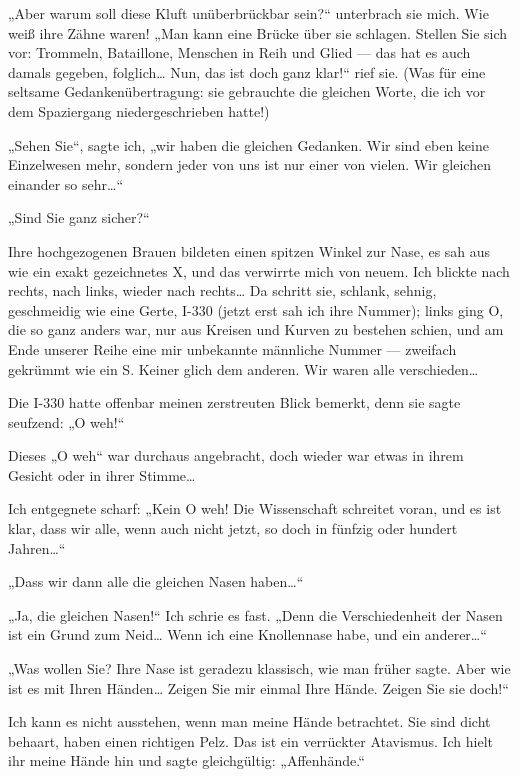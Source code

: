 „Aber warum soll diese Kluft unüberbrückbar sein?“
unterbrach sie mich. Wie weiß ihre Zähne waren! „Man kann eine
Brücke über sie schlagen. Stellen Sie sich vor: Trommeln,
Bataillone, Menschen in Reih und Glied — das hat es auch damals
gegeben, folglich\ldots{} Nun, das ist doch ganz klar!“ rief sie. (Was
für eine seltsame Gedankenübertragung: sie gebrauchte die gleichen
Worte, die ich vor dem Spaziergang niedergeschrieben
hatte!)

„Sehen Sie“, sagte ich, „wir haben die gleichen Gedanken.
Wir sind eben keine Einzelwesen mehr, sondern jeder von uns ist nur
einer von vielen. Wir gleichen einander so sehr\ldots{}“

„Sind Sie ganz sicher?“

Ihre hochgezogenen Brauen bildeten einen spitzen Winkel zur Nase,
es sah aus wie ein exakt gezeichnetes X, und das verwirrte mich von
neuem. Ich blickte nach rechts, nach links, wieder nach rechts\ldots{}
Da schritt sie, schlank, sehnig, geschmeidig wie eine Gerte, I-330
(jetzt erst sah ich ihre Nummer); links ging O, die so ganz anders
war, nur aus Kreisen und Kurven zu bestehen schien, und am Ende
unserer Reihe eine mir unbekannte männliche Nummer — zweifach
gekrümmt wie ein S. Keiner glich dem anderen. Wir waren alle
verschieden\ldots{}

Die I-330 hatte offenbar meinen zerstreuten Blick
bemerkt, denn sie sagte seufzend: „O weh!“

Dieses „O weh“ war
durchaus angebracht, doch wieder war etwas in ihrem Gesicht oder in
ihrer Stimme\ldots{}

Ich entgegnete scharf: „Kein O weh! Die
Wissenschaft schreitet voran, und es ist klar, dass wir alle, wenn
auch nicht jetzt, so doch in fünfzig oder hundert Jahren\ldots{}“

„Dass
wir dann alle die gleichen Nasen haben\ldots{}“

„Ja, die gleichen
Nasen!“ Ich schrie es fast. „Denn die Verschiedenheit der Nasen ist
ein Grund zum Neid\ldots{} Wenn ich eine Knollennase habe, und ein
anderer\ldots{}“

„Was wollen Sie? Ihre Nase ist geradezu klassisch, wie
man früher sagte. Aber wie ist es mit Ihren Händen\ldots{} Zeigen Sie
mir einmal Ihre Hände. Zeigen Sie sie doch!“

Ich kann es nicht
ausstehen, wenn man meine Hände betrachtet. Sie sind dicht behaart,
haben einen richtigen Pelz. Das ist ein verrückter Atavismus. Ich
hielt ihr meine Hände hin und sagte gleichgültig: „Affenhände.“

